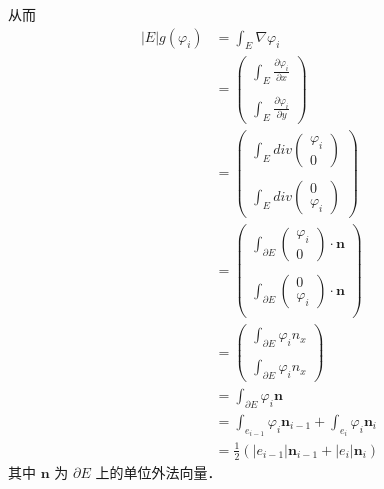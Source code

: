 从而 \\
\begin{equation*}
\begin{aligned}
|E|g(\varphi_i) & = \int_{E} \nabla \varphi_i \\
& = \begin{pmatrix}
\int_{E} \frac{\partial \varphi_i}{\partial x} \\
\\
\int_{E} \frac{\partial \varphi_i}{\partial y}
\end{pmatrix} \\
& = \begin{pmatrix}
\int_{E} div\begin{pmatrix}
\varphi_i \\
0
\end{pmatrix} \\
\\
\int_{E} div\begin{pmatrix}
0 \\
\varphi_i 
\end{pmatrix} 
\end{pmatrix} \\
& = \begin{pmatrix}
\int_{\partial E} \begin{pmatrix}
\varphi_i \\
0
\end{pmatrix}\cdot \mathbf n \\
\\
\int_{\partial E} \begin{pmatrix}
0 \\
\varphi_i 
\end{pmatrix}\cdot \mathbf n \\
\end{pmatrix} \\
& = \begin{pmatrix}
\int_{\partial E} \varphi_i n_x \\
\\
\int_{\partial E} \varphi_i n_x 
\end{pmatrix} \\
& = \int_{\partial E} \varphi_i \mathbf n \\
& = \int_{e_{i - 1}}\varphi_i \mathbf {n}_{i - 1} + \int_{e_{i}}\varphi_i \mathbf {n}_{i} \\
& = \frac{1}{2}(|e_{i - 1}|\mathbf{n}_{i - 1} + |e_i|\mathbf{n}_i)
\end{aligned}
\end{equation*}
其中 $\mathbf{n}$ 为 $\partial E$ 上的单位外法向量． \\

